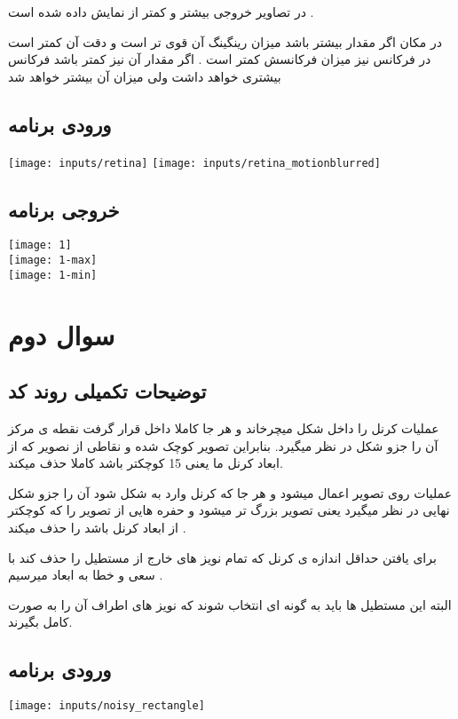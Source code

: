 \documentclass[12pt]{article}
\begin{document}
	در تصاویر خروجی بیشتر و کمتر از 
	نمایش داده شده است .
	
	در مکان اگر مقدار 
	بیشتر باشد 
	میزان رینگینگ آن قوی تر است و دقت آن کمتر است 
	در فرکانس نیز میزان فرکانسش کمتر است .
	اگر مقدار آن نیز کمتر باشد فرکانس بیشتری خواهد داشت ولی میزان 
	آن بیشتر خواهد شد 
	
		\subsection{ورودی برنامه}
		\texttt{[image: inputs/retina]}
		\texttt{[image: inputs/retina\_motionblurred]}
		\subsection{خروجی برنامه}
		
		\texttt{[image: 1]}\\
		\texttt{[image: 1-max]}\\
		\texttt{[image: 1-min]}
		\newpage
		
			\doublespacing
		\section{سوال دوم}
		\subsection{توضیحات تکمیلی روند کد}
	عملیات 
	کرنل را داخل شکل میچرخاند و هر جا کاملا داخل قرار گرفت نقطه ی مرکز آن را جزو شکل در نظر میگیرد. بنابراین تصویر کوچک شده و نقاطی از نصویر که از ابعاد کرنل ما یعنی 15 کوچکتر باشد کاملا حذف میکند. 
	
	عملیات 
	روی تصویر اعمال میشود و هر جا که کرنل وارد به شکل شود آن را جزو شکل نهایی در نظر میگیرد یعنی تصویر بزرگ تر میشود و حفره هایی از تصویر را که کوچکتر از ابعاد کرنل باشد را حذف میکند .
	
	برای یافتن حداقل اندازه ی کرنل که تمام نویز های خارج از مستطیل را حذف کند با سعی و خطا به ابعاد 
	میرسیم .
	
	البته این مستطیل ها باید به گونه ای انتخاب شوند که نویز های اطراف آن را به صورت کامل بگیرند.
		\subsection{ورودی برنامه}
		\texttt{[image: inputs/noisy\_rectangle]}
\end{document}
